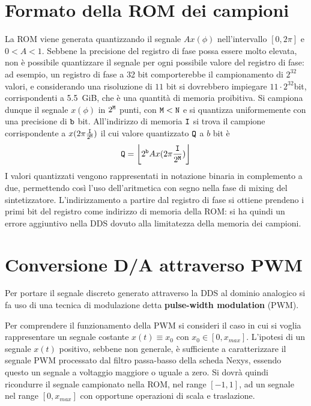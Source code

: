 \section{Formato della ROM dei campioni}
\label{sec:quantizationrom}
La ROM viene generata quantizzando il segnale $Ax(\phi)$ nell'intervallo
$[0, 2\pi]$ e $0 < A < 1$.
Sebbene la precisione del registro di fase possa essere molto elevata, non è
possibile quantizzare il segnale per ogni possibile valore del registro di fase:
ad esempio, un registro di fase a 32 bit comporterebbe il campionamento di $2^{32}$ valori,
e considerando una risoluzione di $11$ bit si dovrebbero impiegare $11\cdot2^{32}$bit,
corrispondenti a \SI{5.5}{GiB}, che è una quantità di memoria proibitiva.
Si campiona dunque il segnale $x(\phi)$ in $2^{\texttt{M}}$ punti, con $\texttt{M} < \texttt{N}$
e si quantizza uniformemente con una precisione di $\texttt{b}$ bit.
All'indirizzo di memoria $\texttt{I}$ si trova il campione corrispondente a
$x(2\pi \frac{\texttt{I}}{2^{\texttt{M}}})$ il cui valore quantizzato $\texttt{Q}$ a $b$ bit è
\begin{equation}
\label{eq:quantization}
\code{Q} = \floor*{2^\code{b} Ax(2\pi \frac{\code{I}}{2^\code{M}})}
\end{equation}
I valori quantizzati vengono rappresentati in notazione binaria in complemento a due,
permettendo così l'uso dell'aritmetica con segno nella fase di mixing del sintetizzatore.
L'indirizzamento a partire dal registro di fase si ottiene prendeno i primi 
bit del registro come indirizzo di memoria della ROM: si ha quindi un errore aggiuntivo
nella DDS dovuto alla limitatezza della memoria dei campioni.

\section{Conversione D/A attraverso PWM}
\label{sec:dapwm}
Per portare il segnale discreto generato attraverso la DDS al dominio analogico si fa uso di una tecnica di modulazione detta \textbf{pulse-width modulation} (PWM).

Per comprendere il funzionamento della PWM si consideri il caso in cui si voglia rappresentare un segnale costante $x(t) \equiv x_0$ con $x_0 \in [0, x_{max}]$.
L'ipotesi di un segnale $x(t)$ positivo, sebbene non generale, è sufficiente
a caratterizzare il segnale PWM processato dal filtro passa-basso della scheda
Nexys, essendo questo un segnale a voltaggio maggiore o uguale a zero.
Si dovrà quindi ricondurre il segnale campionato nella ROM, nel range $[-1,1]$,
ad un segnale nel range $[0,x_{max}]$ con opportune operazioni di scala e
traslazione.

